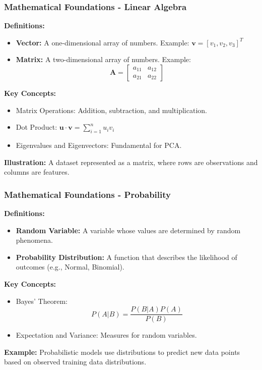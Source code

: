 \documentclass[aspectratio=169]{beamer}
\begin{document}
\begin{frame}[fragile]
    \frametitle{Mathematical Foundations - Linear Algebra}
    \textbf{Definitions:}
    \begin{itemize}
        \item \textbf{Vector:} A one-dimensional array of numbers. Example: \( \mathbf{v} = [v_1, v_2, v_3]^T \)
        \item \textbf{Matrix:} A two-dimensional array of numbers. Example:
        \begin{equation}
            \mathbf{A} = \begin{bmatrix}
            a_{11} & a_{12} \\
            a_{21} & a_{22}
            \end{bmatrix}
        \end{equation}
    \end{itemize}
    
    \textbf{Key Concepts:}
    \begin{itemize}
        \item Matrix Operations: Addition, subtraction, and multiplication.
        \item Dot Product: \( \mathbf{u} \cdot \mathbf{v} = \sum_{i=1}^n u_i v_i \)
        \item Eigenvalues and Eigenvectors: Fundamental for PCA.
    \end{itemize}
    
    \textbf{Illustration:} 
    A dataset represented as a matrix, where rows are observations and columns are features.
\end{frame}

\begin{frame}[fragile]
    \frametitle{Mathematical Foundations - Probability}
    \textbf{Definitions:}
    \begin{itemize}
        \item \textbf{Random Variable:} A variable whose values are determined by random phenomena.
        \item \textbf{Probability Distribution:} A function that describes the likelihood of outcomes (e.g., Normal, Binomial).
    \end{itemize}
    
    \textbf{Key Concepts:}
    \begin{itemize}
        \item Bayes' Theorem: 
        \begin{equation}
            P(A | B) = \frac{P(B | A) P(A)}{P(B)}
        \end{equation}
        \item Expectation and Variance: Measures for random variables.
    \end{itemize}
    
    \textbf{Example:} Probabilistic models use distributions to predict new data points based on observed training data distributions.
\end{frame}
\end{document}
